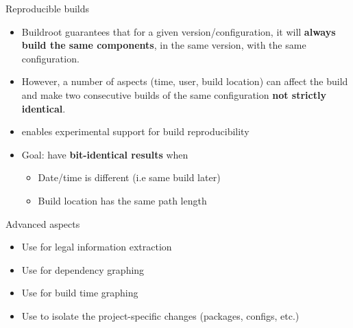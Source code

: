 \begin{frame}{Reproducible builds}
  \begin{itemize}
  \item Buildroot guarantees that for a given version/configuration,
    it will {\bf always build the same components}, in the same
    version, with the same configuration.
  \item However, a number of aspects (time, user, build location) can
    affect the build and make two consecutive builds of the same
    configuration {\bf not strictly identical}.
  \item {} enables experimental support for build
    reproducibility
  \item Goal: have {\bf bit-identical results} when
    \begin{itemize}
    \item Date/time is different (i.e same build later)
    \item Build location has the same path length
    \end{itemize}
  \end{itemize}
\end{frame}

\setuplabframe
{Advanced aspects}
{
  \begin{itemize}
  \item Use  for legal information extraction
  \item Use  for dependency graphing
  \item Use  for build time graphing
  \item Use  to isolate the project-specific
    changes (packages, configs, etc.)
  \end{itemize}
}
